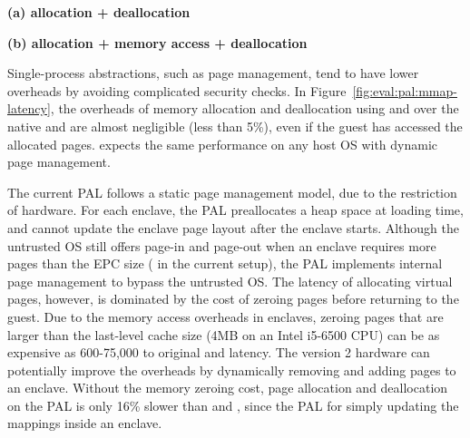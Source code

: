 \label{sec:eval:pal:memory}

\begin{figure*}[t!]
\centering
\footnotesize
{}
\parbox{0.49\textwidth}{\centering\bf (a) allocation + deallocation}
\parbox{0.49\textwidth}{\centering\bf (b) allocation + memory access + deallocation}
\caption{Latency of (a) allocating and deallocating a range of virtual pages, and (b) the same operations with writing to each page after allocation. Lower is better.
The comparison is between (1)  and  on Linux; (2)  and  on the Linux PAL, with and without a \seccomp{} filter ({\bf +SC}) and reference monitor ({\bf +RM}); (3) the same \hostapis{} on the \sgx{} PAL, with and without zeroing the pages before use ({\bf +Zero}).}
\label{fig:eval:pal:mmap-latency}
\end{figure*}

Single-process abstractions, such as page management,
tend to have lower overheads
by avoiding complicated security checks.
In Figure~\ref{fig:eval:pal:mmap-latency},
the overheads of memory allocation and deallocation using  and 
over the native  and 
are almost negligible (less than 5\%),
even if the guest has accessed the allocated pages.
\graphene{} expects the same performance on any host OS with dynamic page management.



The current \sgx{} PAL follows a static page management model,
due to the restriction of \sgx{} hardware.
For each enclave,
the \sgx{} PAL preallocates a heap space
at loading time,
and cannot update the enclave page layout
after the enclave starts. 
Although the untrusted OS still offers page-in and page-out
when an enclave requires more pages
than the EPC size (\sgxepcsize{} in the current setup),
the \sgx{} PAL implements
internal page management to bypass the untrusted OS.
The latency
of allocating virtual pages, however,
is dominated by the cost of zeroing pages before returning to the guest.
Due to the memory access overheads in enclaves,
zeroing pages that are larger than the last-level cache size (4MB on an Intel i5-6500 CPU)
can be as expensive as 600-75,000\x{} to original  and  latency.
The \sgx{} version 2 hardware
can potentially improve the overheads by dynamically removing and adding pages to an enclave.
Without the memory zeroing cost,
page allocation and deallocation on the \sgx{} PAL
is only \roughly{}16\% slower than  and ,
since the \sgx{} PAL
for simply updating the mappings
inside an enclave.

